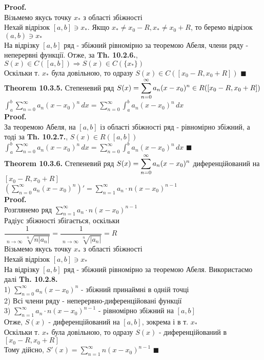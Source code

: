 \documentclass[a4paper, 14pt]{extarticle}
\DeclareMathOperator*\uplim{\overline{lim}}
\def\huge{\displaystyle}
\def\bigline{\vspace{5mm}\\}
\def\th#1{\textbf{Theorem {#1}}}
\def\proof{\textbf{Proof.}\\}
\def\bigline{\vspace{5mm}\\}
\def\qed{$\blacksquare$}
\begin{document}
\proof
Візьмемо якусь точку $x_*$ з області збіжності\\
Нехай відрізок $[a,b] \ni x_*$. Якщо $x_* \neq x_0 - R, x_* \neq x_0 + R$, то беремо відрізок $(a,b) \ni x_*$\\
На відрізку $[a,b]$ ряд - збіжний рівномірно за теоремою Абеля, члени ряду - неперервні функції. Отже, за \textbf{Th. 10.2.6.}, $S(x) \in C([a,b]) \Rightarrow S(x) \in C(\{x_*\})$\\
Оскільки т. $x_*$ була довільною, то одразу $S(x) \in C([x_0-R, x_0+R])$ \qed
\bigline
\th{10.3.5.} Степеневий ряд $\huge S(x) = \sum_{n=0}^\infty a_n(x-x_0)^n \\ \in R([x_0-R,x_0+R])$\\
$\huge \int_a^b \sum_{n=0}^\infty a_n(x-x_0)^n \,dx = \sum_{n=0}^\infty \int_a^b a_n(x-x_0)^n \,dx$\\
\proof
За теоремою Абеля, на $[a,b]$ із області збіжності ряд - рівномірно збіжний, а тоді за \textbf{Th. 10.2.7.}, $S(x) \in R([a,b])$\\
$\huge \int_a^b \sum_{n=0}^\infty a_n(x-x_0)^n \,dx = \sum_{n=0}^\infty \int_a^b a_n(x-x_0)^n \,dx$ \qed
\bigline
\th{10.3.6.} Степеневий ряд $\huge S(x) = \sum_{n=0}^\infty a_n(x-x_0)^n \\ $ диференційований на $[x_0-R,x_0+R]$\\
$\huge \left( \sum_{n=0}^\infty a_n(x-x_0)^n \right)' = \sum_{n=1}^\infty a_n\cdot n(x-x_0)^{n-1}$\\
\proof
Розглянемо ряд $\huge \sum_{n=1}^\infty a_n\cdot n(x-x_0)^{n-1}$\\
Радіус збіжності збігається, оскільки\\
$ \dfrac{1}{\huge \uplim_{n \to \infty} \sqrt[n]{n |a_n|}} = \dfrac{1}{\huge \uplim_{n \to \infty} \sqrt[n]{|a_n|}} = R$\\
Візьмемо якусь точку $x_*$ з області збіжності\\
Нехай відрізок $[a,b] \ni x_*$\\
На відрізку $[a,b]$ ряд - збіжний рівномірно за теоремою Абеля. Використаємо далі \textbf{Th. 10.2.8.}\\
1) $\huge \sum_{n=0}^\infty a_n(x-x_0)^n$ - збіжний принаймні в одній точці\\
2) Всі члени ряду - неперервно-диференційовані функції\\
3) $\huge \sum_{n=1}^\infty a_n \cdot n(x-x_0)^{n-1}$ - рівномірно збіжний на $[a,b]$\\
Отже, $S(x)$ - диференційований на $[a,b]$, зокрема і в т. $x_*$\\
Оскільки т. $x_*$ була довільною, то одразу $S(x)$ - диференційований в $[x_0-R,x_0+R]$\\
Тому дійсно, $S'(x) = \huge \sum_{n=1}^\infty n(x-x_0)^{n-1}$ \qed
\bigline
\end{document}
